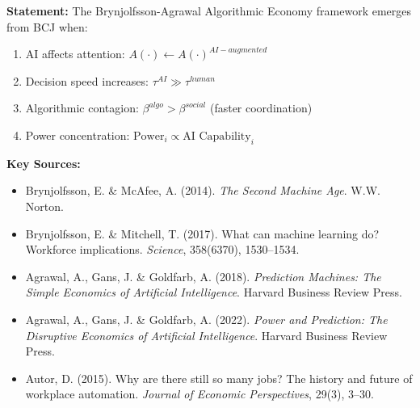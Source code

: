 \begin{tcolorbox}[colback=magenta!5!white, colframe=magenta!75!black,
    title=Theorem BCJ-T45: Algorithmic Coordination as Special Case]
\textbf{Statement:} The Brynjolfsson-Agrawal Algorithmic Economy framework emerges from BCJ when:
\begin{enumerate}[nosep]
\item AI affects attention: $A(\cdot) \leftarrow A(\cdot)^{AI-augmented}$
\item Decision speed increases: $\tau^{AI} \gg \tau^{human}$
\item Algorithmic contagion: $\beta^{algo} > \beta^{social}$ (faster coordination)
\item Power concentration: $\text{Power}_i \propto \text{AI Capability}_i$
\end{enumerate}

\textbf{Key Sources:}
\begin{itemize}[nosep]
\item Brynjolfsson, E. \& McAfee, A. (2014). \textit{The Second Machine Age}. W.W. Norton.
\item Brynjolfsson, E. \& Mitchell, T. (2017). What can machine learning do? Workforce implications. \textit{Science}, 358(6370), 1530--1534.
\item Agrawal, A., Gans, J. \& Goldfarb, A. (2018). \textit{Prediction Machines: The Simple Economics of Artificial Intelligence}. Harvard Business Review Press.
\item Agrawal, A., Gans, J. \& Goldfarb, A. (2022). \textit{Power and Prediction: The Disruptive Economics of Artificial Intelligence}. Harvard Business Review Press.
\item Autor, D. (2015). Why are there still so many jobs? The history and future of workplace automation. \textit{Journal of Economic Perspectives}, 29(3), 3--30.
\end{itemize}


\end{tcolorbox}

